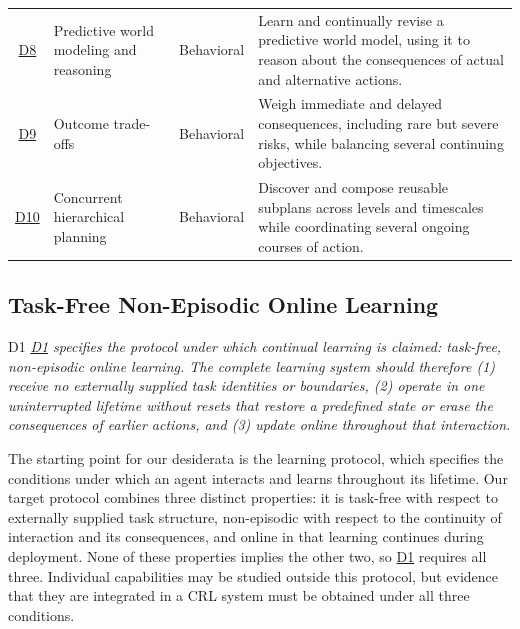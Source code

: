 \documentclass[10pt,journal,compsoc]{IEEEtran}
\DeclareRobustCommand{\Dref}[1]{\hyperref[sec:d#1]{D#1}}
\begin{document}
\begin{table}[!t]
\begin{tabularx}{\textwidth}{@{}c>{\raggedright\arraybackslash}p{}>{\raggedright\arraybackslash}p{}
    >{\raggedright\arraybackslash}X@{}}
        \Dref{8} & Predictive world modeling and reasoning &
        Behavioral &
        Learn and continually revise a predictive world model, using it to reason about the consequences of actual and alternative actions.\\
        \Dref{9} & Outcome trade-offs &
        Behavioral &
        Weigh immediate and delayed consequences, including rare but severe risks, while balancing several continuing objectives.\\
        \Dref{10} & Concurrent hierarchical planning &
        Behavioral &
        Discover and compose reusable subplans across levels and timescales while coordinating several ongoing courses of action.\\
        \bottomrule
    \end{tabularx}
\end{table}
\fi

\subsection{Task-Free Non-Episodic Online Learning}
\label{sec:d1}
\begin{briefbox}[protocolbrief]{D1}
    \emph{\Dref{1} specifies the protocol under which continual learning is claimed: task-free, non-episodic online learning.
    The complete learning system should therefore (1) receive no externally supplied task identities or boundaries, (2) operate in one uninterrupted lifetime without resets that restore a predefined state or erase the consequences of earlier actions, and (3) update online throughout that interaction.}
\end{briefbox}

\noindent The starting point for our desiderata is the learning protocol, which specifies the conditions under which an agent interacts and learns throughout its lifetime.
Our target protocol combines three distinct properties: it is task-free with respect to externally supplied task structure, non-episodic with respect to the continuity of interaction and its consequences, and online in that learning continues during deployment.
None of these properties implies the other two, so \Dref{1} requires all three.
Individual capabilities may be studied outside this protocol, but evidence that they are integrated in a CRL system must be obtained under all three conditions.
\end{document}
